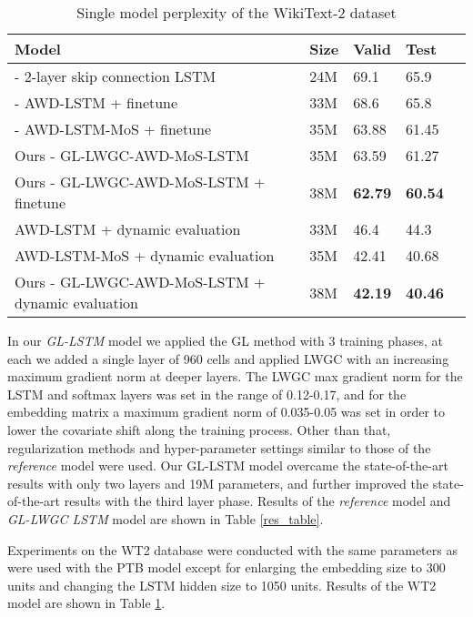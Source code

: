 \documentclass{article}
\begin{document}
\begin{table}[!ht] 
  \caption{Single model perplexity of the WikiText-2 dataset}
  \centering
  \begin{tabular}{lllll}
    \toprule
    \textbf{Model}	& \textbf{Size} 	& \textbf{Valid} & \textbf{Test} \\
    \toprule
    \citet{melis2017state} - 2-layer skip connection LSTM & 24M &  69.1 & 65.9 \\
    \citet{Regularizing_Optimizing_LSTM_LM} - AWD-LSTM + finetune                 & 33M & 68.6 & 65.8 \\
    \citet{mos} - AWD-LSTM-MoS + finetune & 35M & 63.88 & 61.45\\
    \midrule
    Ours - GL-LWGC-AWD-MoS-LSTM & 35M & 63.59 & 61.27 \\
    Ours - GL-LWGC-AWD-MoS-LSTM + finetune & 38M & \textbf{62.79} & \textbf{60.54} \\
    \midrule
    \citet{dynamicEval} AWD-LSTM + dynamic evaluation\footnote[2] & 33M & 46.4 & 44.3 \\
    \citet{mos} AWD-LSTM-MoS + dynamic evaluation\footnote[2] & 35M & 42.41 & 40.68 \\
    Ours - GL-LWGC-AWD-MoS-LSTM + dynamic evaluation\footnote[2] & 38M & \textbf{42.19} & \textbf{40.46} \\
    \bottomrule
  \end{tabular}
  \label{wiki_res_table}
\end{table}
In our \textit{GL-LSTM} model we applied  the GL method with 3 training phases, at each we added a single layer of 960 cells and applied LWGC with an increasing maximum gradient norm at deeper layers. The LWGC max gradient norm for the LSTM and softmax layers was set in the range of 0.12-0.17, and for the embedding matrix a maximum gradient norm of 0.035-0.05 was set in order to lower the covariate shift along the training process. Other than that, regularization methods and hyper-parameter settings similar to those of the \textit{reference} model were used. Our GL-LSTM model overcame the state-of-the-art results with only two layers and 19M parameters, and further improved the state-of-the-art results with the third layer phase. Results of the \textit{reference} model and \textit{GL-LWGC LSTM} model are shown in Table \ref{res_table}. 

Experiments on the WT2 database were conducted with the same parameters as were used with the PTB model except for enlarging the embedding size to 300 units and changing the LSTM hidden size to 1050 units. Results of the WT2 model are shown in Table \ref{wiki_res_table}.
\end{document}

